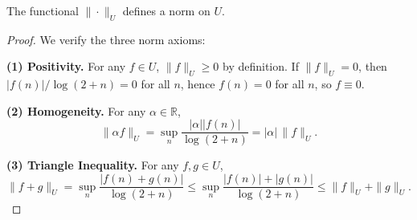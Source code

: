 \documentclass[10pt,a4paper]{amsart}
\begin{document}
\begin{proposition}
	The functional $\|\cdot\|_{U}$ defines a norm on $U$.
\end{proposition}

\begin{proof}
	We verify the three norm axioms:
	
	\textbf{(1) Positivity.}
	For any $f\in U$, $\|f\|_{U}\ge0$ by definition.
	If $\|f\|_{U}=0$, then $|f(n)|/\log(2+n)=0$ for all $n$,
	hence $f(n)=0$ for all $n$, so $f\equiv 0$.
	
	\textbf{(2) Homogeneity.}
	For any $\alpha\in\mathbb{R}$,
	\[
	\|\alpha f\|_{U}
	= \sup_{n}\frac{|\alpha||f(n)|}{\log(2+n)}
	= |\alpha|\,\|f\|_{U}.
	\]
	
	\textbf{(3) Triangle Inequality.}
	For any $f,g\in U$,
	\[
	\|f+g\|_{U}
	= \sup_{n}\frac{|f(n)+g(n)|}{\log(2+n)}
	\le \sup_{n}\frac{|f(n)|+|g(n)|}{\log(2+n)}
	\le \|f\|_{U}+\|g\|_{U}.
	\]
\end{proof}
\end{document}
